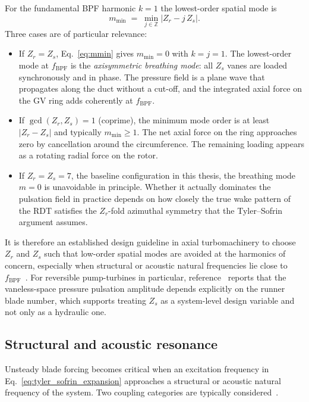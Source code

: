 For the fundamental BPF harmonic $k=1$ the lowest-order spatial mode
is
\begin{equation}
    m_{\min} \;=\; \min_{j\in\mathbb{Z}} \bigl| Z_r - j\,Z_s \bigr|.
    \label{eq:mmin}
\end{equation}
Three cases are of particular relevance:
\begin{itemize}
  \item If $Z_r = Z_s$, Eq.~\eqref{eq:mmin} gives $m_{\min}=0$ with
        $k=j=1$. The lowest-order mode at $f_{\mathrm{BPF}}$ is the
        \emph{axisymmetric breathing mode}: all $Z_s$ vanes are
        loaded synchronously and in phase. The pressure field is a
        plane wave that propagates along the duct without a cut-off,
        and the integrated axial force on the \ac{GV} ring adds
        coherently at $f_{\mathrm{BPF}}$.
  \item If $\gcd(Z_r,Z_s)=1$ (coprime), the minimum mode order is at
        least $|Z_r - Z_s|$ and typically $m_{\min} \geq 1$. The net
        axial force on the ring approaches zero by cancellation
        around the circumference. The remaining loading appears as a
        rotating radial force on the rotor.
  \item If $Z_r = Z_s = 7$, the baseline configuration in this
        thesis, the breathing mode $m=0$ is unavoidable in principle.
        Whether it actually dominates the pulsation field in practice
        depends on how closely the true wake pattern of the \ac{RDT}
        satisfies the $Z_r$-fold azimuthal symmetry that the
        Tyler--Sofrin argument assumes.
\end{itemize}
It is therefore an established design guideline in axial
turbomachinery to choose $Z_r$ and $Z_s$ such that low-order spatial
modes are avoided at the harmonics of concern, especially when
structural or acoustic natural frequencies lie close to
$f_{\mathrm{BPF}}$~\cite{brekke,egusquiza2006,tanaka2011}. For
reversible pump-turbines in particular,
reference~\cite{nduwayezu2021} reports that the vaneless-space
pressure pulsation amplitude depends explicitly on the runner blade
number, which supports treating $Z_s$ as a system-level design
variable and not only as a hydraulic one.

\subsection{Structural and acoustic resonance}
\label{sec:rsi-resonance}

Unsteady blade forcing becomes critical when an excitation frequency
in Eq.~\eqref{eq:tyler_sofrin_expansion} approaches a structural or
acoustic natural frequency of the system. Two coupling categories
are typically considered~\cite{egusquiza2006,tanaka2011}.

